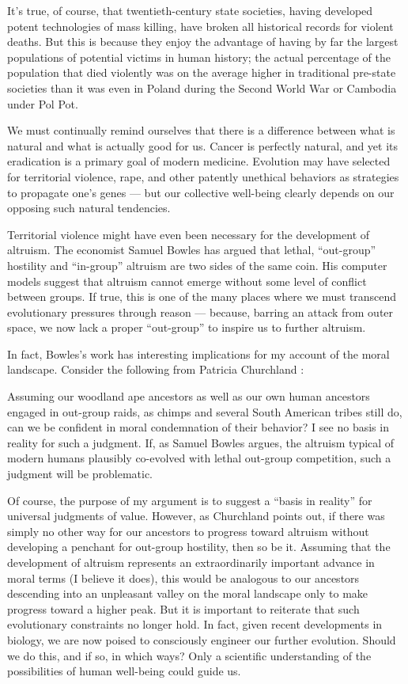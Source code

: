 \documentclass[a4paper,14pt]{extarticle}
\begin{document}
It’s true, of course, that twentieth-century state societies, having developed potent technologies of mass killing, have broken all historical records for violent deaths.
But this is because they enjoy the advantage of having by far the largest populations of potential victims in human history;
the actual percentage of the population that died violently was on the average higher in traditional pre-state societies than it was even in Poland during the Second World War or Cambodia under Pol Pot.

We must continually remind ourselves that there is a difference between what is natural and what is actually good for us.
Cancer is perfectly natural, and yet its eradication is a primary goal of modern medicine.
Evolution may have selected for territorial violence, rape, and other patently unethical behaviors as strategies to propagate one’s genes --- but our collective well-being clearly depends on our opposing such natural tendencies.

Territorial violence might have even been necessary for the development of altruism.
The economist Samuel Bowles has argued that lethal, ``out-group'' hostility and ``in-group'' altruism are two sides of the same coin.
His computer models suggest that altruism cannot emerge without some level of conflict between groups.
If true, this is one of the many places where we must transcend evolutionary pressures through reason --- because, barring an attack from outer space, we now lack a proper ``out-group'' to inspire us to further altruism.

In fact, Bowles’s work has interesting implications for my account of the moral landscape.
Consider the following from Patricia Churchland :

Assuming our woodland ape ancestors as well as our own human ancestors engaged in out-group raids, as chimps and several South American tribes still do, can we be confident in moral condemnation of their behavior?
I see no basis in reality for such a judgment.
If, as Samuel Bowles argues, the altruism typical of modern humans plausibly co-evolved with lethal out-group competition, such a judgment will be problematic.

Of course, the purpose of my argument is to suggest a ``basis in reality'' for universal judgments of value.
However, as Churchland points out, if there was simply no other way for our ancestors to progress toward altruism without developing a penchant for out-group hostility, then so be it.
Assuming that the development of altruism represents an extraordinarily important advance in moral terms (I believe it does), this would be analogous to our ancestors descending into an unpleasant valley on the moral landscape only to make progress toward a higher peak.
But it is important to reiterate that such evolutionary constraints no longer hold.
In fact, given recent developments in biology, we are now poised to consciously engineer our further evolution.
Should we do this, and if so, in which ways?
Only a scientific understanding of the possibilities of human well-being could guide us.
\end{document}
